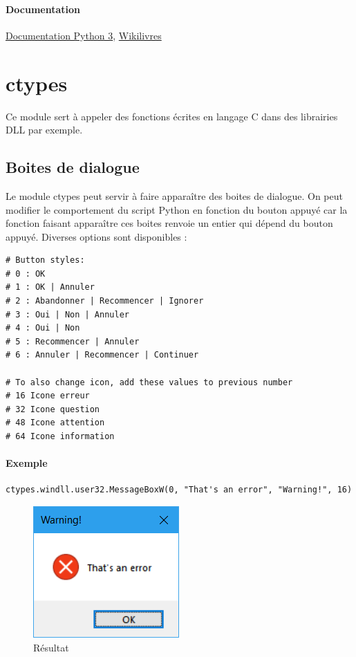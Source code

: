 \documentclass[a4paper, 10pt]{article}
\begin{document}
\paragraph{Documentation} \href{https://docs.python.org/fr/3.6/library/turtle.html#methods-specific-to-screen-not-inherited-from-turtlescreen}{Documentation Python 3}, \href{https://fr.wikibooks.org/wiki/Programmation_Python/Turtle}{Wikilivres}

\section{ctypes}
 Ce module sert à appeler des fonctions écrites en langage C dans des librairies DLL par exemple.
\subsection{Boites de dialogue}
 Le module ctypes peut servir à faire apparaître des boites de dialogue. On peut modifier le comportement du script Python en fonction du bouton appuyé car la fonction faisant apparaître ces boites renvoie un entier qui dépend du bouton appuyé. Diverses options sont disponibles :
\begin{verbatim}
# Button styles:
# 0 : OK
# 1 : OK | Annuler
# 2 : Abandonner | Recommencer | Ignorer
# 3 : Oui | Non | Annuler
# 4 : Oui | Non
# 5 : Recommencer | Annuler
# 6 : Annuler | Recommencer | Continuer

# To also change icon, add these values to previous number
# 16 Icone erreur
# 32 Icone question
# 48 Icone attention
# 64 Icone information
\end{verbatim}

\paragraph{Exemple}
\begin{verbatim}
ctypes.windll.user32.MessageBoxW(0, "That's an error", "Warning!", 16)
\end{verbatim}
\begin{figure}[h]
\begin{center}
\includegraphics[scale=0.5]{errorwindow.png}
\caption*{Résultat}
\end{center}
\end{figure}
\end{document}
